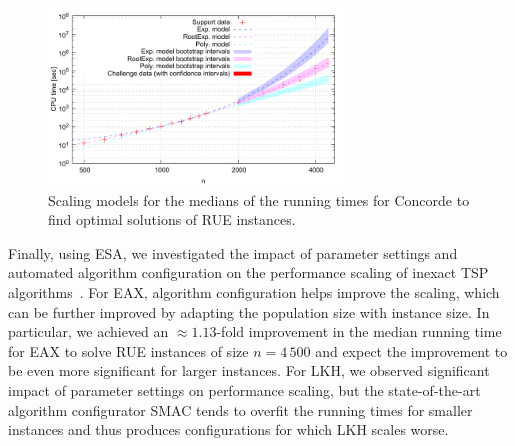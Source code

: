 \documentclass[aic]{iosart2x}
\begin{document}
\begin{figure}[t]
\noindent \begin{centering}
\includegraphics[width=0.7\textwidth]{concorde_fittedModels}  \vspace{-5mm}
\par\end{centering}

\caption{Scaling models for the medians of the running times for Concorde to find optimal solutions of RUE instances. }\label{fig:Fitted-models-concorde} 
\end{figure}


Finally, using ESA, we investigated the impact of parameter settings and automated algorithm configuration on the performance scaling of inexact TSP algorithms~\cite{MuEtAl16}. For EAX, algorithm configuration helps improve the scaling, which can be further improved by adapting the population size with instance size. In particular, we achieved an $\approx1.13$-fold improvement in the median running time for EAX to solve RUE instances of size $n=4\,500$ and expect the improvement to be even more significant for larger instances. For LKH, we observed significant impact of parameter settings on performance scaling, but the state-of-the-art algorithm configurator SMAC tends to overfit the running times for smaller instances and thus produces configurations for which LKH scales worse.
\end{document}
